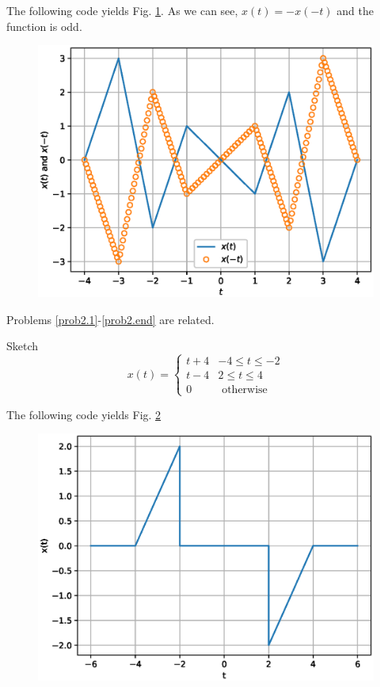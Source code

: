 \documentclass[journal,12pt,twocolumn]{IEEEtran}
\begin{document}
\solution The following code yields Fig. \ref{fig_4c}. As we can see, $x(t)= -x(-t)$ and the function is odd.

\begin{figure}[!h]
\begin{center}
\includegraphics[width=\columnwidth]{./figs/4c}
\end{center}
\label{fig_4c}	
\end{figure}
%
Problems \ref{prob2.1}-\ref{prob2.end} are related.
%
\begin{problem}
\label{prob2.1}
Sketch 
%
\begin{equation}
x(t) = 
\begin{cases}
t + 4 & -4 \le t \le -2 \\
t-4 & 2 \le t \le  4 \\
0 & \text{ otherwise }
\end{cases}
\end{equation}
%
\end{problem}
\solution The following code yields Fig. \ref{fig_8}

\begin{figure}[!h]
\begin{center}
\includegraphics[width=\columnwidth]{./figs/8}
\end{center}
\label{fig_8}	
\end{figure}
\end{document}
